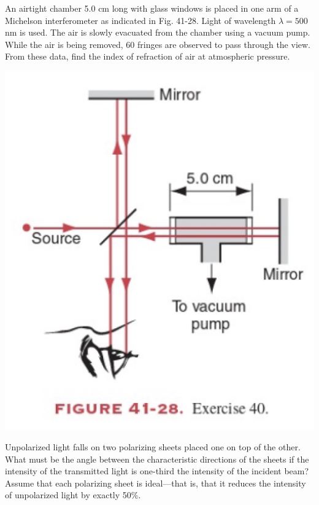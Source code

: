 \documentclass[12pt,letterpaper]{hmcpset}
\begin{document}
	\begin{problem}[41E40:]
		An airtight chamber 5.0 cm long with glass windows is placed in one arm of a Michelson interferometer as indicated in Fig. 41-28.
		Light of wavelength $\lambda = 500$ nm is used.
		The air is slowly evacuated from the chamber using a vacuum pump.
		While the air is being removed, 60 fringes are observed to pass through the view.
		From these data, find the index of refraction of air at atmospheric pressure.

		\centering\includegraphics[scale = 0.4]{Fig_41-28}
	\end{problem}
	\clearpage



	\begin{problem}[44E4:]
		Unpolarized light falls on two polarizing sheets placed one on top of the other.
		What must be the angle between the characteristic directions of the sheets if the intensity of the transmitted light is one-third the intensity of the incident beam?
		Assume that each polarizing sheet is ideal—that is, that it reduces the intensity of unpolarized light by exactly 50\%.
	\end{problem}
	\clearpage
\end{document}
